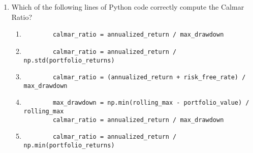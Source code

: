 \documentclass{article}
\begin{document}
\begin{enumerate}
    \item Which of the following lines of Python code correctly compute the Calmar Ratio?
    \begin{enumerate}
        \item \begin{verbatim}
        calmar_ratio = annualized_return / max_drawdown
        \end{verbatim}
        \item \begin{verbatim}
        calmar_ratio = annualized_return / np.std(portfolio_returns)
        \end{verbatim}
        \item \begin{verbatim}
        calmar_ratio = (annualized_return + risk_free_rate) / max_drawdown
        \end{verbatim}
        \item \begin{verbatim}
        max_drawdown = np.min(rolling_max - portfolio_value) / rolling_max
        calmar_ratio = annualized_return / max_drawdown
        \end{verbatim}
        \item \begin{verbatim}
        calmar_ratio = annualized_return / np.min(portfolio_returns)
        \end{verbatim}
    \end{enumerate}


\end{enumerate}

\clearpage


\end{document}
